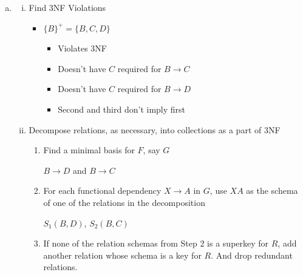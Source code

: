 \documentclass[12pt]{article}
\begin{document}
\begin{enumerate}[1.]
\begin{enumerate}[a)]
        \item

        \begin{enumerate}[i)]
            \item Find 3NF Violations

            \bigskip

            \color{red}
            \begin{itemize}
                \item $\{B\}^+ = \{B,C,D\}$
                \begin{itemize}
                    \item Violates 3NF
                    \item Doesn't have $C$ required for $B \to C$
                    \item Doesn't have $C$ required for $B \to D$
                    \item Second and third don't imply first
                \end{itemize}
            \end{itemize}
            \color{black}

            \item Decompose relations, as necessary, into collections as a part of 3NF

            \bigskip

            \begin{enumerate}[1.]
                \item Find a minimal basis for $F$, say $G$

                \bigskip

                \color{red}
                $B \to D$ and $B \to C$
                \color{black}

                \bigskip

                \item For each functional dependency $X \to A$ in $G$, use $XA$
                as the schema of one of the relations in the decomposition

                \bigskip

                $S_1(B,D)$, $S_2(B,C)$

                \bigskip

                \item If none of the relation schemas from Step 2 is a superkey for $R$,
                add another relation whose schema is a key for $R$. And drop redundant relations.

            \end{enumerate}
        \end{enumerate}


    \end{enumerate}

\end{enumerate}
\end{document}
